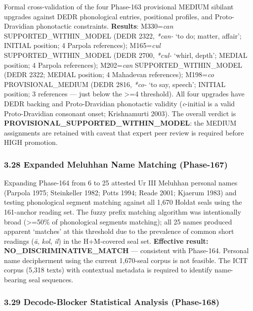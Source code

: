 \documentclass[
]{article}
\begin{document}
Formal cross-validation of the four Phase-163 provisional MEDIUM
sibilant upgrades against DEDR phonological entries, positional
profiles, and Proto-Dravidian phonotactic constraints. \textbf{Results}:
M330=\emph{can} SUPPORTED\_WITHIN\_MODEL (DEDR 2322, \emph{*can-} `to do; matter,
affair'; INITIAL position; 4 Parpola references); M165=\emph{cul}
SUPPORTED\_WITHIN\_MODEL (DEDR 2700, \emph{*cul-} `whirl, depth'; MEDIAL position;
4 Parpola references); M202=\emph{can} SUPPORTED\_WITHIN\_MODEL (DEDR 2322; MEDIAL
position; 4 Mahadevan references); M198=\emph{co} PROVISIONAL\_MEDIUM (DEDR
2816, \emph{*co-} `to say, speech'; INITIAL position; 3 references ---
just below the \textgreater{}=4 threshold). All four upgrades have DEDR backing and
Proto-Dravidian phonotactic validity (\emph{c}-initial is a valid
Proto-Dravidian consonant onset; Krishnamurti 2003). The overall verdict
is \textbf{PROVISIONAL\_SUPPORTED\_WITHIN\_MODEL}: the MEDIUM assignments are retained
with caveat that expert peer review is required before HIGH promotion.

\subsubsection{3.28 Expanded Meluhhan Name Matching
(Phase-167)}\label{expanded-meluhhan-name-matching-phase-167}

Expanding Phase-164 from 6 to 25 attested Ur III Meluhhan personal
names (Parpola 1975; Steinkeller 1982; Potts 1994; Reade 2001;
Kjaerum 1983) and testing phonological segment matching against all
1,670 Holdat seals using the 161-anchor reading set. The fuzzy prefix
matching algorithm was intentionally broad (\textgreater{}=50\% of phonological
segments matching); all 25 names produced apparent `matches' at this
threshold due to the prevalence of common short readings (\emph{ā},
\emph{kol}, \emph{il}) in the H+M-covered seal set. \textbf{Effective
result: NO\_DISCRIMINATIVE\_MATCH} --- consistent with Phase-164.
Personal name decipherment using the current 1,670-seal corpus is not
feasible. The ICIT corpus (5,318 texts) with contextual metadata is
required to identify name-bearing seal sequences.

\subsubsection{3.29 Decode-Blocker Statistical Analysis
(Phase-168)}\label{decode-blocker-statistical-analysis-phase-168}
\end{document}
